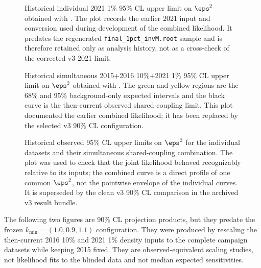 \begin{figure}[p]
\centering
{}
\caption{Historical individual 2021 1\% 95\% CL upper limit on $\eps^2$ obtained
with \CLs{}. The plot records the earlier 2021 input and conversion used during
development of the combined likelihood. It predates the regenerated
\texttt{final\_1pct\_invM.root} sample and is therefore retained only as analysis history,
not as a cross-check of the corrected v3 2021 limit.}
\label{fig:app-legacy-95-individual-2021}
\end{figure}

\begin{figure}[p]
\centering
{}
\caption{Historical simultaneous 2015$+$2016 10\%$+$2021 1\% 95\% CL upper limit
on $\eps^2$ obtained with \CLs{}. The green and yellow regions are the 68\% and 95\%
background-only expected intervals and the black curve is the then-current observed
shared-coupling limit. This plot documented the earlier combined likelihood; it has
been replaced by the selected v3 90\% CL configuration.}
\label{fig:app-legacy-95-combined}
\end{figure}

\begin{figure}[p]
\centering
{}
\caption{Historical observed 95\% CL upper limits on $\eps^2$ for the individual
datasets and their simultaneous shared-coupling combination. The plot was used to
check that the joint likelihood behaved recognizably relative to its inputs; the
combined curve is a direct profile of one common $\eps^2$, not the pointwise envelope
of the individual curves. It is superseded by the clean v3 90\% CL comparison in the
archived v3 result bundle.}
\label{fig:app-legacy-95-observed-overlay}
\end{figure}

The following two figures are 90\% CL projection products, but they predate the frozen
$k_{\min}=(1.0,0.9,1.1)$ configuration. They were produced by rescaling the then-current
2016 10\% and 2021 1\% density inputs to the complete campaign datasets while keeping
2015 fixed. They are observed-equivalent scaling studies, not likelihood fits to the
blinded data and not median expected sensitivities.

